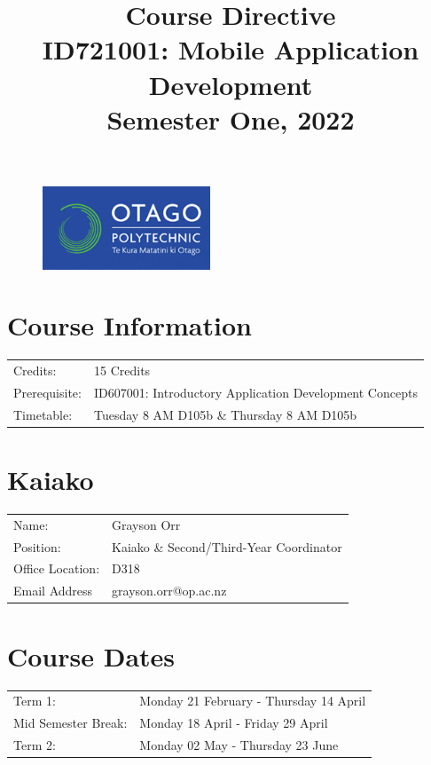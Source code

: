 \documentclass{article}
\author{}
\begin{document}
\begin{figure}
	\includegraphics[width=50mm]{../../resources/img/logo.png}
\end{figure}

\title{Course Directive\\ID721001: Mobile Application Development\\Semester One, 2022}
\date{}
\maketitle

\section*{Course Information}
\begin{tabular}{ll}
	Credits:      & 15 Credits                                              \\
	Prerequisite: & ID607001: Introductory Application Development Concepts \\
	Timetable:    & Tuesday 8 AM D105b \& Thursday 8 AM D105b
\end{tabular}

\section*{Kaiako}
\begin{tabular}{ll}
	Name:            & Grayson Orr                             \\
	Position:        & Kaiako \& Second/Third-Year Coordinator \\
	Office Location: & D318                                    \\
	Email Address    & grayson.orr@op.ac.nz                    \\
\end{tabular}

\section*{Course Dates}
\begin{tabular}{ll}
	Term 1:             & Monday 21 February - Thursday 14 April \\
	Mid Semester Break: & Monday 18 April - Friday 29 April      \\
	Term 2:             & Monday 02 May - Thursday 23 June       \\
\end{tabular}
\end{document}
